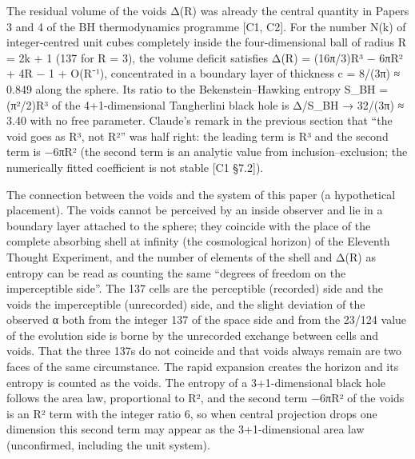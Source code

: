 \documentclass[
  a4paper,
]{article}
\begin{document}
The residual volume of the voids Δ(R) was already the central quantity
in Papers 3 and 4 of the BH thermodynamics programme {[}C1, C2{]}. For
the number N(k) of integer-centred unit cubes completely inside the
four-dimensional ball of radius R = 2k + 1 (137 for R = 3), the volume
deficit satisfies Δ(R) = (16π/3)R³ − 6πR² + 4R − 1 + O(R⁻¹),
concentrated in a boundary layer of thickness c = 8/(3π) ≈ 0.849 along
the sphere. Its ratio to the Bekenstein--Hawking entropy S\_BH =
(π²/2)R³ of the 4+1-dimensional Tangherlini black hole is Δ/S\_BH →
32/(3π) ≈ 3.40 with no free parameter. Claude's remark in the previous
section that ``the void goes as R³, not R²'' was half right: the leading
term is R³ and the second term is −6πR² (the second term is an analytic
value from inclusion--exclusion; the numerically fitted coefficient is
not stable {[}C1 §7.2{]}).

The connection between the voids and the system of this paper (a
hypothetical placement). The voids cannot be perceived by an inside
observer and lie in a boundary layer attached to the sphere; they
coincide with the place of the complete absorbing shell at infinity (the
cosmological horizon) of the Eleventh Thought Experiment, and the number
of elements of the shell and Δ(R) as entropy can be read as counting the
same ``degrees of freedom on the imperceptible side''. The 137 cells are
the perceptible (recorded) side and the voids the imperceptible
(unrecorded) side, and the slight deviation of the observed α both from
the integer 137 of the space side and from the 23/124 value of the
evolution side is borne by the unrecorded exchange between cells and
voids. That the three 137s do not coincide and that voids always remain
are two faces of the same circumstance. The rapid expansion creates the
horizon and its entropy is counted as the voids. The entropy of a
3+1-dimensional black hole follows the area law, proportional to R², and
the second term −6πR² of the voids is an R² term with the integer ratio
6, so when central projection drops one dimension this second term may
appear as the 3+1-dimensional area law (unconfirmed, including the unit
system).
\end{document}
